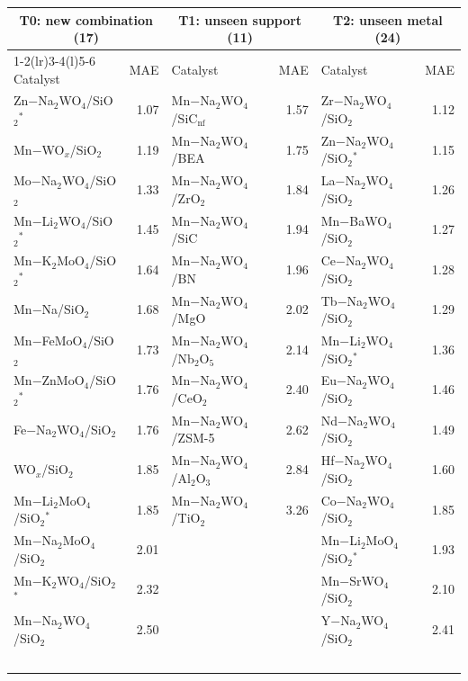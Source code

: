 \begin{tabular}{lr@{\hspace{2em}}lr@{\hspace{2em}}lr}
\toprule
\multicolumn{2}{c}{T0: new combination (17)} & \multicolumn{2}{c}{T1: unseen support (11)} & \multicolumn{2}{c}{T2: unseen metal (24)} \\
\cmidrule(r){1-2}\cmidrule(lr){3-4}\cmidrule(l){5-6}
Catalyst & MAE & Catalyst & MAE & Catalyst & MAE \\
\midrule
Zn$-$Na$_{2}$WO$_{4}$/SiO$_{2}$$^*$ & 1.07 & Mn$-$Na$_{2}$WO$_{4}$/SiC$_\mathrm{nf}$ & 1.57 & Zr$-$Na$_{2}$WO$_{4}$/SiO$_{2}$ & 1.12 \\
Mn$-$WO$_x$/SiO$_{2}$ & 1.19 & Mn$-$Na$_{2}$WO$_{4}$/BEA & 1.75 & Zn$-$Na$_{2}$WO$_{4}$/SiO$_{2}$$^*$ & 1.15 \\
Mo$-$Na$_{2}$WO$_{4}$/SiO$_{2}$ & 1.33 & Mn$-$Na$_{2}$WO$_{4}$/ZrO$_{2}$ & 1.84 & La$-$Na$_{2}$WO$_{4}$/SiO$_{2}$ & 1.26 \\
Mn$-$Li$_{2}$WO$_{4}$/SiO$_{2}$$^*$ & 1.45 & Mn$-$Na$_{2}$WO$_{4}$/SiC & 1.94 & Mn$-$BaWO$_{4}$/SiO$_{2}$ & 1.27 \\
Mn$-$K$_{2}$MoO$_{4}$/SiO$_{2}$$^*$ & 1.64 & Mn$-$Na$_{2}$WO$_{4}$/BN & 1.96 & Ce$-$Na$_{2}$WO$_{4}$/SiO$_{2}$ & 1.28 \\
Mn$-$Na/SiO$_{2}$ & 1.68 & Mn$-$Na$_{2}$WO$_{4}$/MgO & 2.02 & Tb$-$Na$_{2}$WO$_{4}$/SiO$_{2}$ & 1.29 \\
Mn$-$FeMoO$_{4}$/SiO$_{2}$ & 1.73 & Mn$-$Na$_{2}$WO$_{4}$/Nb$_{2}$O$_{5}$ & 2.14 & Mn$-$Li$_{2}$WO$_{4}$/SiO$_{2}$$^*$ & 1.36 \\
Mn$-$ZnMoO$_{4}$/SiO$_{2}$$^*$ & 1.76 & Mn$-$Na$_{2}$WO$_{4}$/CeO$_{2}$ & 2.40 & Eu$-$Na$_{2}$WO$_{4}$/SiO$_{2}$ & 1.46 \\
Fe$-$Na$_{2}$WO$_{4}$/SiO$_{2}$ & 1.76 & Mn$-$Na$_{2}$WO$_{4}$/ZSM-5 & 2.62 & Nd$-$Na$_{2}$WO$_{4}$/SiO$_{2}$ & 1.49 \\
WO$_x$/SiO$_{2}$ & 1.85 & Mn$-$Na$_{2}$WO$_{4}$/Al$_{2}$O$_{3}$ & 2.84 & Hf$-$Na$_{2}$WO$_{4}$/SiO$_{2}$ & 1.60 \\
Mn$-$Li$_{2}$MoO$_{4}$/SiO$_{2}$$^*$ & 1.85 & Mn$-$Na$_{2}$WO$_{4}$/TiO$_{2}$ & 3.26 & Co$-$Na$_{2}$WO$_{4}$/SiO$_{2}$ & 1.85 \\
Mn$-$Na$_{2}$MoO$_{4}$/SiO$_{2}$ & 2.01 &  &  & Mn$-$Li$_{2}$MoO$_{4}$/SiO$_{2}$$^*$ & 1.93 \\
Mn$-$K$_{2}$WO$_{4}$/SiO$_{2}$$^*$ & 2.32 &  &  & Mn$-$SrWO$_{4}$/SiO$_{2}$ & 2.10 \\
Mn$-$Na$_{2}$WO$_{4}$/SiO$_{2}$ & 2.50 &  &  & Y$-$Na$_{2}$WO$_{4}$/SiO$_{2}$ & 2.41 \\
$$
\end{tabular}
